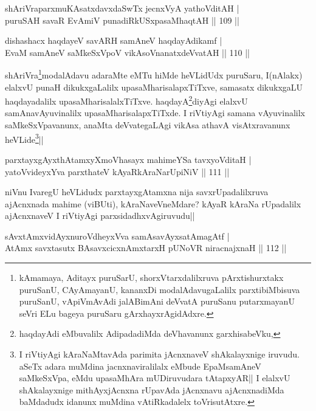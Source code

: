 \begin{shl}
shAriVraparxmuKAsatxdavxdaSwTx jecnxVyA yathoVditAH |\\
puruSAH savaR EvAmiV punadiRkUSxpasaMhaqtAH \hfill || 109 ||
\end{shl}

\begin{shl}
dishashacx haqdayeV savARH samAneV haqdayAdikamf |\\
EvaM samAneV saMkeSxVpoV vikAsoV\s nanatxdeVvatAH \hfill || 110 ||
\end{shl}

\begin{artha}
shAriVra\footnote[4]{kAmamaya, Aditayx puruSarU, shorxVtarxdalilxruva pArxtishurxtakx puruSanU, CAyAmayanU, kananxDi modalAdavugaLalilx parxtibiMbisuva puruSanU, vApiVmAvAdi jalABimAni deVvatA puruSanu putarxmayanU seVri ELu bageya puruSaru gArxhayxrAgidAdxre.}modalAdavu adaraMte eMTu hiMde heVLidUdx puruSaru, I(nAlakx) elalxvU punaH dikukxgaLalilx upasaMharisalapxTiTxve, samasatx dikukxgaLU haqdayadalilx upasaMharisalalxTiTxve. haqdayA\footnote[5]{haqdayAdi eMbuvalilx AdipadadiMda deVhavanunx garxhisabeVku,}diyAgi elalxvU samAnavAyuvinalilx upasaMharisalapxTiTxde. I riVtiyAgi samana vAyuvinalilx saMkeSxVpavanunx, anaMta deVvategaLAgi vikAsa athavA visAtxravanunx heVLide\footnote[6]{I riVtiyAgi kAraNaMtavAda parimita jAcnxnaveV shAkalayxnige iruvudu. aSeTx adara muMdina jacnxnaviralilalx eMbude EpaMsamAneV saMkeSxVpa, eMdu upasaMhAra mUDiruvudara tAtapxyAR|| I elalxvU shAkalayxnige mithAyxjAcnxna rUpavAda jAcnxnavu ajAcnxnadiMda baMdadudx idanunx muMdina vAtiRkadalelx toVrisutAtxre.}||
\end{artha}

\begin{shl}
parxtayxgAyxthAtamxyXmoVhasayx mahimeYSa tavxyoVditaH |\\
yatoV\s videyxYva parxthateV kAyaRkAraNarUpiNiV \hfill || 111 ||
\end{shl}

\begin{artha}%
niVnu IvaregU heVLidudx parxtayxgAtamxna nija savxrUpadalilxruva ajAcnxnada mahime (viBUti), kAraNaveVneMdare? kAyaR kAraNa rUpadalilx ajAcnxnaveV I riVtiyAgi parxsidadhxvAgiruvudu||
\end{artha}


\begin{shl}
sAvxtAmxvidAyxnuroVdheyxVva samAsavAyxsatAmagAtf |\\
AtAmx savxtasutx BAsavxcicxnAmxtarxH pUNoVR niracnajxnaH \hfill || 112 ||
\end{shl}

